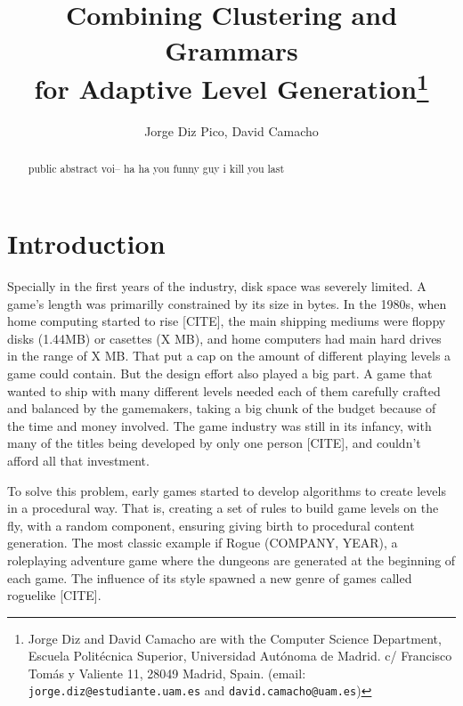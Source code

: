 \documentclass[conference]{IEEEtran}
\begin{document}
\title{\ \\ \LARGE\bf Combining Clustering and Grammars \\ for Adaptive Level Generation\thanks{Jorge Diz and David Camacho are with the Computer Science Department, Escuela Politécnica Superior, Universidad Autónoma de Madrid. c/ Francisco Tomás y Valiente 11, 28049 Madrid, Spain. (email: {\tt jorge.diz@estudiante.uam.es} and {\tt david.camacho@uam.es})}}

\author{Jorge Diz Pico, David Camacho}


\maketitle

\begin{abstract}

public abstract voi-- ha ha you funny guy i kill you last

\end{abstract}


\section{Introduction}

Specially in the first years of the industry, disk space was severely limited. A game's length was primarilly constrained by its size in bytes. In the 1980s, when home computing started to rise [CITE], the main shipping mediums were floppy disks (1.44MB) or casettes (X MB), and home computers had main hard drives in the range of X MB. That put a cap on the amount of different playing levels a game could contain. But the design effort also played a big part. A game that wanted to ship with many different levels needed each of them carefully crafted and balanced by the gamemakers, taking a big chunk of the budget because of the time and money involved. The game industry was still in its infancy, with many of the titles being developed by only one person [CITE], and couldn't afford all that investment.

To solve this problem, early games started to develop algorithms to create levels in a procedural way. That is, creating a set of rules to build game levels on the fly, with a random component, ensuring  giving birth to procedural content generation. The most classic example if Rogue (COMPANY, YEAR), a roleplaying adventure game where the dungeons are generated at the beginning of each game. The influence of its style spawned a new genre of games called roguelike [CITE].
\end{document}
